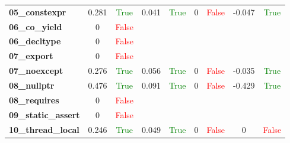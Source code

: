 \documentclass{article}
\begin{document}
\begin{xltabular}{\textwidth}{lcccccccc}
\textbf{05\_constexpr}& 0.281&\textcolor{green}{True}& 0.041&\textcolor{green}{True}& 0&\textcolor{red}{False}& -0.047&\textcolor{green}{True} \\[0.5ex]
\textbf{06\_co\_yield}& 0&\textcolor{red}{False} \\[0.5ex]
\textbf{06\_decltype}& 0&\textcolor{red}{False} \\[0.5ex]
\textbf{07\_export}& 0&\textcolor{red}{False} \\[0.5ex]
\textbf{07\_noexcept}& 0.276&\textcolor{green}{True}& 0.056&\textcolor{green}{True}& 0&\textcolor{red}{False}& -0.035&\textcolor{green}{True} \\[0.5ex]
\textbf{08\_nullptr}& 0.476&\textcolor{green}{True}& 0.091&\textcolor{green}{True}& 0&\textcolor{red}{False}& -0.429&\textcolor{green}{True} \\[0.5ex]
\textbf{08\_requires}& 0&\textcolor{red}{False} \\[0.5ex]
\textbf{09\_static\_assert}& 0&\textcolor{red}{False} \\[0.5ex]
\textbf{10\_thread\_local}& 0.246&\textcolor{green}{True}& 0.049&\textcolor{green}{True}& 0&\textcolor{red}{False}& 0&\textcolor{red}{False} \\[0.5ex]
\bottomrule
\end{xltabular}
\end{document}
